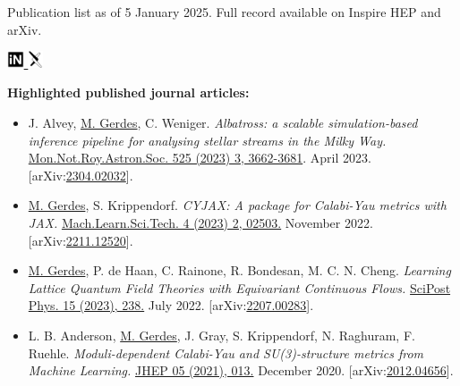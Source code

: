 \documentclass[12pt]{article}
\title{}
\author{}
\date{}
\begin{document}
\thispagestyle{firstpagestyle}

Publication list as of 5 January 2025. Full record available on Inspire HEP and arXiv.

{\hfill \small
\href{https://inspirehep.net/authors/2107097}{\includegraphics[height=14pt]{inspire.pdf} \hspace*{-7pt} } \hspace*{10pt}
\href{https://arxiv.org/a/gerdes_m_1.html}{\includegraphics[height=14pt]{arxiv.pdf} \hspace*{-10pt} }
}

\textbf{Highlighted published journal articles:}

\begin{itemize}[left=0pt, itemsep=5pt]
    \item J. Alvey, \underline{M. Gerdes}, C. Weniger.
    \textit{Albatross: a scalable simulation-based inference pipeline for analysing stellar streams in the Milky Way.}
    \href{https://doi.org/10.1093/mnras/stad2458}{Mon.Not.Roy.Astron.Soc. 525 (2023) 3, 3662-3681}.
    April 2023.
    [arXiv:\href{https://arxiv.org/abs/2304.02032}{2304.02032}].

    \item \underline{M. Gerdes}, S. Krippendorf.
    \textit{CYJAX: A package for Calabi-Yau metrics with JAX.}
    \newline \href{https://doi.org/10.1088/2632-2153/acdc84}{Mach.Learn.Sci.Tech. 4 (2023) 2, 02503.}
    November 2022.
    [arXiv:\href{https://arxiv.org/abs/2211.12520}{2211.12520}].

    \item \underline{M. Gerdes}, P. de Haan, C. Rainone, R. Bondesan, M. C. N. Cheng.
    \textit{Learning Lattice Quantum Field Theories with Equivariant Continuous Flows.}
    \href{https://doi.org/10.21468/SciPostPhys.15.6.238}{SciPost Phys. 15 (2023), 238.}
    July 2022.
    [arXiv:\href{https://arxiv.org/abs/2207.00283}{2207.00283}].

    \item L. B. Anderson, \underline{M. Gerdes}, J. Gray, S. Krippendorf, N. Raghuram, F. Ruehle.
    \linebreak \textit{Moduli-dependent Calabi-Yau and SU(3)-structure metrics from Machine Learning.}
    \href{https://doi.org/10.1007/JHEP05(2021)013}{JHEP 05 (2021), 013.}
    December 2020.
    [arXiv:\href{https://arxiv.org/abs/2012.04656}{2012.04656}].
\end{itemize}
\end{document}
